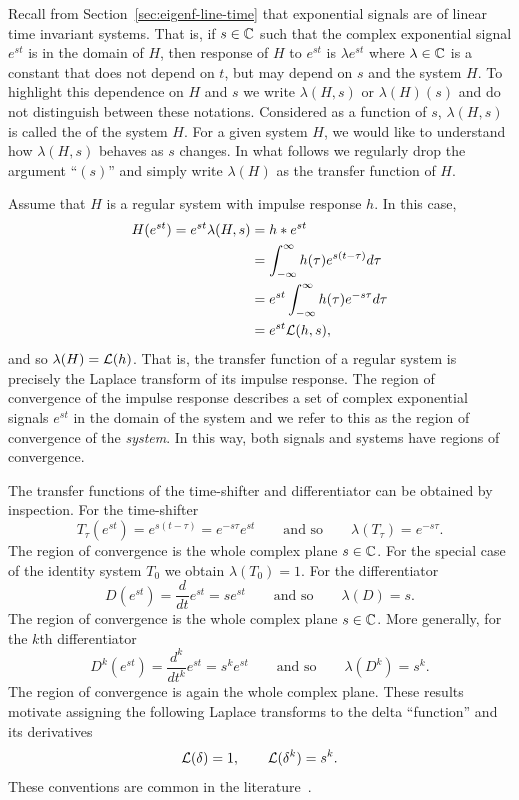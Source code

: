 Recall from Section~\ref{sec:eigenf-line-time} that exponential signals are  of linear time invariant systems.  That is, if $s \in {\mathbb C}$ such that the complex exponential signal $e^{st}$ is in the domain of $H$, then response of $H$ to $e^{st}$ is $\lambda e^{st}$ where $\lambda \in {\mathbb C}$ is a constant that does not depend on $t$, but may depend on $s$ and the system $H$.  To highlight this dependence on $H$ and $s$ we write $\lambda(H,s)$ or $\lambda(H)(s)$ and do not distinguish between these notations.  Considered as a function of $s$, $\lambda(H,s)$ is called the  of the system $H$.  For a given system $H$, we would like to understand how $\lambda(H,s)$ behaves as $s$ changes.  In what follows we regularly drop the argument ``$(s)$'' and simply write $\lambda(H)$ as the transfer function of $H$.  

Assume that $H$ is a regular system with impulse response $h$.  In this case,
\begin{align*}
H(e^{st}) = e^{st} \lambda(H,s) &= h * e^{st} \\
&= \int_{-\infty}^{\infty} h(\tau) e^{s(t - \tau)} d\tau \\
&= e^{st} \int_{-\infty}^{\infty} h(\tau) e^{-s \tau} d\tau \\
&= e^{st} \mathcal L(h,s),
\end{align*}
and so $\lambda(H) = \mathcal L(h)$.  That is, the transfer function of a regular system is precisely the Laplace transform of its impulse response.  The region of convergence of the impulse response describes a set of complex exponential signals $e^{st}$ in the domain of the system and we refer to this as the region of convergence of the \emph{system}.  In this way, both signals and systems have regions of convergence.

The transfer functions of the time-shifter and differentiator can be obtained by inspection.  For the time-shifter
\begin{equation}\label{eq:timeshiftertransferfunction}
T_\tau(e^{st}) = e^{s(t-\tau)} = e^{-s\tau} e^{st} \qquad \text{and so} \qquad \lambda(T_\tau) = e^{-s\tau}.
\end{equation}
The region of convergence is the whole complex plane $s \in {\mathbb C}$.  For the special case of the identity system $T_0$ we obtain $\lambda(T_0) = 1$.  For the differentiator
\[
D(e^{st}) = \frac{d}{d t} e^{st} = s e^{st} \qquad \text{and so} \qquad \lambda(D) = s.
\]
The region of convergence is the whole complex plane $s \in {\mathbb C}$.  More generally, for the $k$th differentiator
\begin{equation}\label{eq:lambdadifferentiator}
D^k(e^{st}) = \frac{d^k}{d t^k} e^{st} = s^k e^{st} \qquad \text{and so} \qquad  \lambda(D^k) = s^k.
\end{equation}
The region of convergence is again the whole complex plane.  These results motivate assigning the following Laplace transforms to the delta ``function'' and its derivatives
\[
\mathcal L(\delta) = 1, \qquad \mathcal L(\delta^k) = s^k.
\]
These conventions are common in the literature~\citep{Oppenheiim_sigs_sys_1996}.


